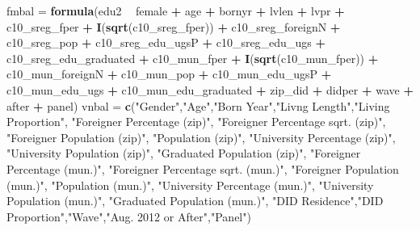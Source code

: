 \documentclass[
]{article}
\newenvironment{Shaded}{\begin{snugshade}}{\end{snugshade}}
\newcommand{\KeywordTok}[1]{\textcolor[rgb]{0.13,0.29,0.53}{\textbf{#1}}}
\newcommand{\NormalTok}[1]{#1}
\newcommand{\OperatorTok}[1]{\textcolor[rgb]{0.81,0.36,0.00}{\textbf{#1}}}
\newcommand{\StringTok}[1]{\textcolor[rgb]{0.31,0.60,0.02}{#1}}
\begin{document}
\begin{Shaded}
\begin{Highlighting}[]
\NormalTok{fmbal =}\StringTok{ }\KeywordTok{formula}\NormalTok{(edu2 }\OperatorTok{~}\StringTok{ }\NormalTok{female }\OperatorTok{+}\StringTok{ }\NormalTok{age }\OperatorTok{+}\StringTok{ }\NormalTok{bornyr }\OperatorTok{+}\StringTok{ }\NormalTok{lvlen }\OperatorTok{+}\StringTok{ }\NormalTok{lvpr }\OperatorTok{+}\StringTok{ }
\StringTok{                  }\NormalTok{c10_sreg_fper }\OperatorTok{+}\StringTok{ }\KeywordTok{I}\NormalTok{(}\KeywordTok{sqrt}\NormalTok{(c10_sreg_fper)) }\OperatorTok{+}\StringTok{ }\NormalTok{c10_sreg_foreignN }\OperatorTok{+}\StringTok{ }\NormalTok{c10_sreg_pop }\OperatorTok{+}\StringTok{ }
\StringTok{                  }\NormalTok{c10_sreg_edu_ugsP }\OperatorTok{+}\StringTok{ }\NormalTok{c10_sreg_edu_ugs }\OperatorTok{+}\StringTok{ }\NormalTok{c10_sreg_edu_graduated }\OperatorTok{+}\StringTok{ }
\StringTok{                  }\NormalTok{c10_mun_fper }\OperatorTok{+}\StringTok{ }\KeywordTok{I}\NormalTok{(}\KeywordTok{sqrt}\NormalTok{(c10_mun_fper)) }\OperatorTok{+}\StringTok{ }\NormalTok{c10_mun_foreignN }\OperatorTok{+}\StringTok{ }\NormalTok{c10_mun_pop }\OperatorTok{+}\StringTok{ }
\StringTok{                  }\NormalTok{c10_mun_edu_ugsP }\OperatorTok{+}\StringTok{ }\NormalTok{c10_mun_edu_ugs }\OperatorTok{+}\StringTok{ }\NormalTok{c10_mun_edu_graduated }\OperatorTok{+}\StringTok{ }
\StringTok{                  }\NormalTok{zip_did }\OperatorTok{+}\StringTok{ }\NormalTok{didper }\OperatorTok{+}\StringTok{ }\NormalTok{wave }\OperatorTok{+}\StringTok{ }\NormalTok{after }\OperatorTok{+}\StringTok{ }\NormalTok{panel)}
\NormalTok{vnbal =}\StringTok{ }\KeywordTok{c}\NormalTok{(}\StringTok{"Gender"}\NormalTok{,}\StringTok{"Age"}\NormalTok{,}\StringTok{"Born Year"}\NormalTok{,}\StringTok{"Livng Length"}\NormalTok{,}\StringTok{"Living Proportion"}\NormalTok{,}
          \StringTok{"Foreigner Percentage (zip)"}\NormalTok{, }\StringTok{"Foreigner Percentage sqrt. (zip)"}\NormalTok{, }
          \StringTok{"Foreigner Population (zip)"}\NormalTok{, }\StringTok{"Population (zip)"}\NormalTok{,}
          \StringTok{"University Percentage (zip)"}\NormalTok{,  }
          \StringTok{"University Population (zip)"}\NormalTok{, }\StringTok{"Graduated Population (zip)"}\NormalTok{,}
          \StringTok{"Foreigner Percentage (mun.)"}\NormalTok{, }\StringTok{"Foreigner Percentage sqrt. (mun.)"}\NormalTok{, }
          \StringTok{"Foreigner Population (mun.)"}\NormalTok{, }\StringTok{"Population (mun.)"}\NormalTok{,}
          \StringTok{"University Percentage (mun.)"}\NormalTok{,  }
          \StringTok{"University Population (mun.)"}\NormalTok{, }\StringTok{"Graduated Population (mun.)"}\NormalTok{,}
          \StringTok{"DID Residence"}\NormalTok{,}\StringTok{"DID Proportion"}\NormalTok{,}\StringTok{"Wave"}\NormalTok{,}\StringTok{"Aug. 2012 or After"}\NormalTok{,}\StringTok{"Panel"}\NormalTok{)}


\end{Highlighting}
\end{Shaded}
\end{document}
